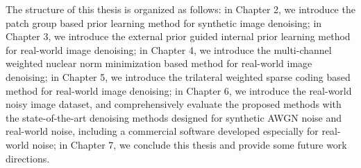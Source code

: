 The structure of this thesis is organized as follows: in Chapter 2, we introduce the patch group based prior learning method for synthetic image denoising; in Chapter 3, we introduce the external prior guided internal prior learning method for real-world image denoising; in Chapter 4, we introduce the multi-channel weighted nuclear norm minimization based method for real-world image denoising; in Chapter 5, we introduce the trilateral weighted sparse coding based method for real-world image denoising; in Chapter 6, we introduce the real-world noisy image dataset, and comprehensively evaluate the proposed methods with the state-of-the-art denoising methods designed for synthetic AWGN noise and real-world noise, including a commercial software developed especially for real-world noise; in Chapter 7, we conclude this thesis and provide some future work directions.






